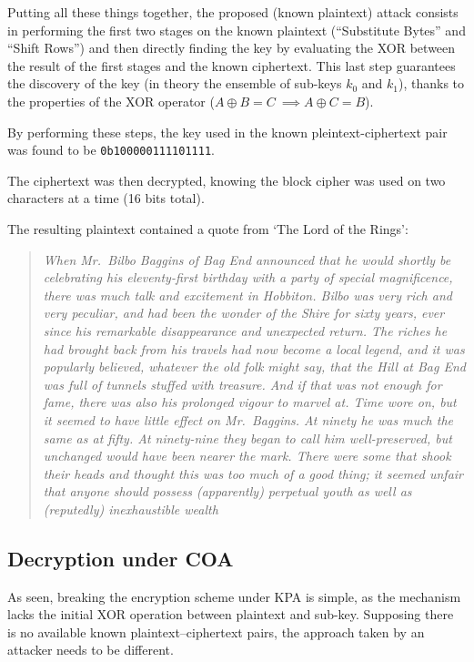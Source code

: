 \documentclass[12pt]{article}
\begin{document}
Putting all these things together, the proposed (known plaintext) attack consists in performing the first two stages on the known plaintext (``Substitute Bytes'' and ``Shift Rows'') and then directly finding the key by evaluating the XOR between the result of the first stages and the known ciphertext. This last step guarantees the discovery of the key (in theory the ensemble of sub-keys $k_0$ and $k_1$), thanks to the properties of the XOR operator ($A\oplus B = C\ \implies A\oplus C = B$).

By performing these steps, the key used in the known pleintext-ciphertext pair was found to be \verb|0b100000111101111|.

The ciphertext was then decrypted, knowing the block cipher was used on two characters at a time (16 bits total).

The resulting plaintext contained a quote from `The Lord of the Rings':

\begin{quote}
   \textit{When Mr.\ Bilbo Baggins of Bag End announced that he would shortly be celebrating his eleventy-first birthday with a party of special magnificence, there was much talk and excitement in Hobbiton. 
   Bilbo was very rich and very peculiar, and had been the wonder of the Shire for sixty years, ever since his remarkable disappearance and unexpected return. 
   The riches he had brought back from his travels had now become a local legend, and it was popularly believed, whatever the old folk might say, that the Hill at Bag End was full of tunnels stuffed with treasure. 
   And if that was not enough for fame, there was also his prolonged vigour to marvel at. Time wore on, but it seemed to have little effect on Mr.\ Baggins.
   At ninety he was much the same as at fifty. 
   At ninety-nine they began to call him well-preserved, but unchanged would have been nearer the mark. 
   There were some that shook their heads and thought this was too much of a good thing; it seemed unfair that anyone should possess (apparently) perpetual youth as well as (reputedly) inexhaustible wealth}
\end{quote}

\subsection{Decryption under COA}
\label{sec:03.1}

As seen, breaking the encryption scheme under KPA is simple, as the mechanism lacks the initial XOR operation between plaintext and sub-key.
Supposing there is no available known plaintext–ciphertext pairs, the approach taken by an attacker needs to be different.
\end{document}
